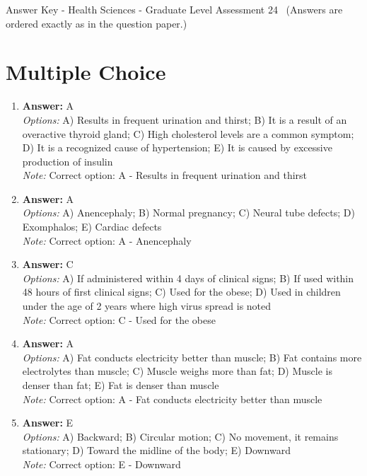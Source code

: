 \documentclass[12pt]{article}
\begin{document}
\begin{center}
Answer Key - Health Sciences - Graduate Level Assessment 24 \
\small (Answers are ordered exactly as in the question paper.)
\end{center}

\section*{Multiple Choice}
\begin{enumerate}[label=\arabic*.]
\item \textbf{Answer:} A
\\ \textit{Options:} A) Results in frequent urination and thirst; B) It is a result of an overactive thyroid gland; C) High cholesterol levels are a common symptom; D) It is a recognized cause of hypertension; E) It is caused by excessive production of insulin
\\ \textit{Note:} Correct option: A - Results in frequent urination and thirst
\item \textbf{Answer:} A
\\ \textit{Options:} A) Anencephaly; B) Normal pregnancy; C) Neural tube defects; D) Exomphalos; E) Cardiac defects
\\ \textit{Note:} Correct option: A - Anencephaly
\item \textbf{Answer:} C
\\ \textit{Options:} A) If administered within 4 days of clinical signs; B) If used within 48 hours of first clinical signs; C) Used for the obese; D) Used in children under the age of 2 years where high virus spread is noted
\\ \textit{Note:} Correct option: C - Used for the obese
\item \textbf{Answer:} A
\\ \textit{Options:} A) Fat conducts electricity better than muscle; B) Fat contains more electrolytes than muscle; C) Muscle weighs more than fat; D) Muscle is denser than fat; E) Fat is denser than muscle
\\ \textit{Note:} Correct option: A - Fat conducts electricity better than muscle
\item \textbf{Answer:} E
\\ \textit{Options:} A) Backward; B) Circular motion; C) No movement, it remains stationary; D) Toward the midline of the body; E) Downward
\\ \textit{Note:} Correct option: E - Downward
\end{enumerate}
\end{document}

